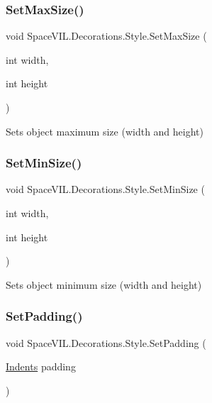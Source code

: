 \subsubsection{\texorpdfstring{Set\+Max\+Size()}{SetMaxSize()}}
{\footnotesize\ttfamily void Space\+V\+I\+L.\+Decorations.\+Style.\+Set\+Max\+Size (\begin{DoxyParamCaption}\item[{int}]{width,  }\item[{int}]{height }\end{DoxyParamCaption})}



Sets object maximum size (width and height) 

\mbox{\label{class_space_v_i_l_1_1_decorations_1_1_style_a5203493f4987e3ab38153597e1d688b5}} 
\subsubsection{\texorpdfstring{Set\+Min\+Size()}{SetMinSize()}}
{\footnotesize\ttfamily void Space\+V\+I\+L.\+Decorations.\+Style.\+Set\+Min\+Size (\begin{DoxyParamCaption}\item[{int}]{width,  }\item[{int}]{height }\end{DoxyParamCaption})}



Sets object minimum size (width and height) 

\mbox{\label{class_space_v_i_l_1_1_decorations_1_1_style_a7cbc0aea1575dd933c3280fcc2d095c3}} 
\subsubsection{\texorpdfstring{Set\+Padding()}{SetPadding()}\hspace{0.1cm}{\footnotesize\ttfamily [1/2]}}
{\footnotesize\ttfamily void Space\+V\+I\+L.\+Decorations.\+Style.\+Set\+Padding (\begin{DoxyParamCaption}\item[{\mbox{\hyperlink{struct_space_v_i_l_1_1_decorations_1_1_indents}{Indents}}}]{padding }\end{DoxyParamCaption})}



